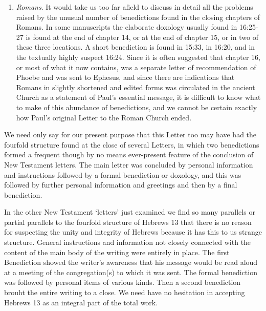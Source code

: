 \begin{enumerate}
\item {\it Romans}.
    It would take us too far afield to discuss in detail all the problems raised
    by the unusual number of benedictions found in the closing chapters of
    Romans.
    In some manuscripts the elaborate doxology usually found in 16:25-27 is
    found at the end of chapter 14, or at the end of chapter 15, or in two of
    these three locations.
    A short benediction is found in 15:33, in 16:20, and in the textually highly
    suspect 16:24.
    Since it is often suggested that chapter 16, or most of what it now contains,
    was a separate letter of recommendation of Phoebe and was sent to Ephesus,
    and since there are indications that Romans in slightly shortened and edited
    forms was circulated in the ancient Church as a statement of Paul's
    essential message, it is difficult to know what to make of this abundance of
    benedictions, and we cannot be certain exactly how Paul's original Letter to
    the Roman Church ended.
\end{enumerate}

We need only say for our present purpose that this Letter too may have had the
fourfold structure found at the close of several Letters, in which two
benedictions formed a frequent though by no means ever-present feature of the
conclusion of New Testament letters.
The main letter was concluded by personal information and instructions followed
by a formal benediction or doxology, and this was followed by further personal
information and greetings and then by a final benediction.

In the other New Testament `letters' just examined we find so many parallels or
partial parallels to the fourfold structure of Hebrews 13 that there is no
reason for suspecting the unity and integrity of Hebrews because it has this to
us strange structure.
General instructions and information not closely connected with the content of
the main body of the writing were entirely in place.
The first Benediction showed the writer's awareness that his message would be
read aloud at a meeting of the congregation(s) to which it was sent.
The formal benediction was followed by personal items of various kinds.
Then a second benediction brouht the entire writing to a close.
We need have no hesitation in accepting Hebrews 13 as an integral part of the
total work.
